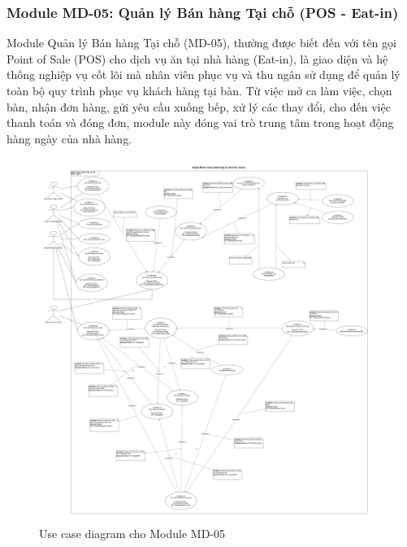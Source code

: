 \subsubsection{Module MD-05: Quản lý Bán hàng Tại chỗ (POS - Eat-in)}
Module Quản lý Bán hàng Tại chỗ (MD-05), thường được biết đến với tên gọi Point of Sale (POS) cho dịch vụ ăn tại nhà hàng (Eat-in), là giao diện và hệ thống nghiệp vụ cốt lõi mà nhân viên phục vụ và thu ngân sử dụng để quản lý toàn bộ quy trình phục vụ khách hàng tại bàn. Từ việc mở ca làm việc, chọn bàn, nhận đơn hàng, gửi yêu cầu xuống bếp, xử lý các thay đổi, cho đến việc thanh toán và đóng đơn, module này đóng vai trò trung tâm trong hoạt động hàng ngày của nhà hàng.



\begin{figure}[H]
    \centering
    \includegraphics[width=15cm]{Sections/tong_quan/functional_spec/img/uc5.png}
    \vspace{0.5cm}
    \caption{Use case diagram cho Module MD-05}
    \label{fig:my_label}
\end{figure}


